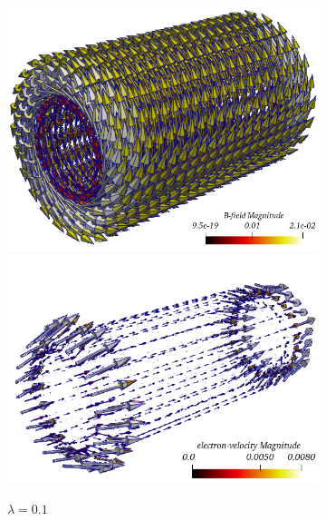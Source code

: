 \documentclass{article}
\begin{document}
\begin{figure}
\begin{subfigure}[b]{\textwidth}
        \hspace{0.3cm}
        \includegraphics[scale=0.2]{paper_version/figures/B-field_lambda-1e-1.png}
        \includegraphics[scale=0.2]{paper_version/figures/electronVel_lambda-1e-1.png}
        \caption{\colorbox{yellow!30}{$\lambda = 0.1$}}
    \end{subfigure}
    \begin{subfigure}[b]{\textwidth}
        \hspace{-1cm}
\end{subfigure}
\end{figure}
\end{document}
